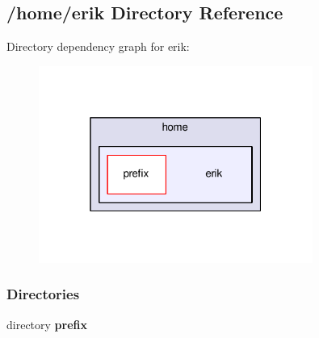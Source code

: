 \subsection{/home/erik Directory Reference}
\label{dir_cf764c42155f97c8834fa9e0239058a2}
Directory dependency graph for erik\+:
\nopagebreak
\begin{figure}[H]
\begin{center}
\leavevmode
\includegraphics[width=254pt]{dir_cf764c42155f97c8834fa9e0239058a2_dep}
\end{center}
\end{figure}
\subsubsection*{Directories}
\begin{DoxyCompactItemize}
\item 
directory {\bf prefix}
\end{DoxyCompactItemize}

